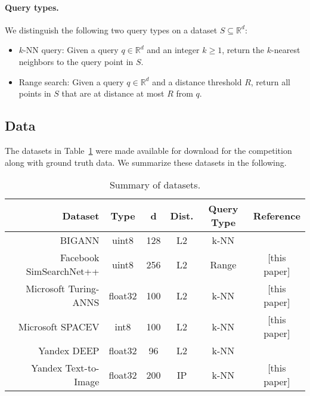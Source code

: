 \paragraph{Query types.}
We distinguish the following two query types on a dataset $S \subseteq \mathbb{R}^d$:
\begin{itemize}
  \item $k$-NN query: Given a query $q \in \mathbb{R}^d$ and an integer $k \geq 1$, return the $k$-nearest neighbors to the query point in $S$.  
  \item Range search: Given a query $q \in \mathbb{R}^d$ and a distance threshold $R$, return all points in $S$ that are at distance at most $R$ from $q$.
\end{itemize}

\subsection{Data}
The datasets in Table~\ref{table:datasets} were made available for download for the competition along with ground truth data.
We summarize these datasets in the following.

\begin{table}
  \begin{tabular}{r c c c c c}
    Dataset & Type & d & Dist. & Query Type & Reference \\\hline
    \textsf{BIGANN} &	uint8	& 128	& L2	& k-NN & \cite{SIFT1B} \\
    \textsf{Facebook SimSearchNet++} & uint8 & 256 & L2 & Range & [this paper]\\
    \textsf{Microsoft Turing-ANNS} & float32 & 100 & L2 & k-NN & [this paper] \\
    \textsf{Microsoft SPACEV} & int8 & 100 & L2 & k-NN & [this paper] \\
    \textsf{Yandex DEEP} & float32 & 96 & L2 & k-NN & \cite{deep1b-link} \\
    \textsf{Yandex Text-to-Image} & float32 & 200 & IP & k-NN & [this paper]
  \end{tabular}
  \caption{Summary of datasets.}
  \label{table:datasets}
\end{table}



